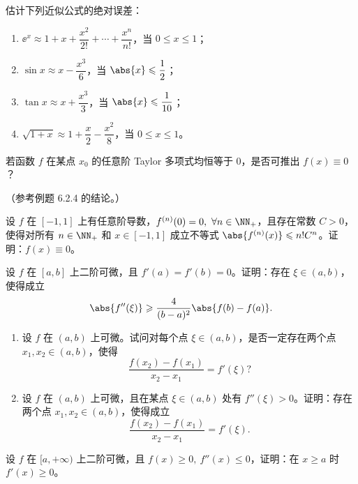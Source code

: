 \begin{xexercise}[8]
估计下列近似公式的绝对误差：
\begin{enumerate}[label=(\arabic*)]
  \item $\ee^x\approx1+x+\dfrac{x^2}{2!}+\cdots+\dfrac{x^n}{n!}$，当 $0\leqslant x\leqslant1$；
  \item $\sin x\approx x-\dfrac{x^3}{6}$，当 $\abs{x}\leqslant\dfrac12$；
  \item $\tan x\approx x+\dfrac{x^3}{3}$，当 $\abs{x}\leqslant\dfrac{1}{10}$；
  \item $\sqrt{1+x}\approx1+\dfrac{x}{2}-\dfrac{x^2}{8}$，当 $0\leqslant x\leqslant1$。
\end{enumerate}
\end{xexercise}

\begin{xexercise}[9]
若函数 $f$ 在某点 $x_0$ 的任意阶 Taylor 多项式均恒等于 0，是否可推出 $f(x)\equiv0$？

（参考例题 6.2.4 的结论。）
\end{xexercise}

\begin{xexercise}[10]
设 $f$ 在 $[-1,1]$ 上有任意阶导数，$f^{(n)}(0)=0,\ \forall n\in\NN_+$，且存在常数 $C>0$，使得对所有 $n\in\NN_+$ 和 $x\in[-1,1]$ 成立不等式 $\abs{f^{(n)}(x)}\leqslant n!C^n$。证明：$f(x)\equiv0$。
\end{xexercise}

\begin{xexercise}[11]
设 $f$ 在 $[a,b]$ 上二阶可微，且 $f'(a)=f'(b)=0$。证明：存在 $\xi\in(a,b)$，使得成立
\[
  \abs{f''(\xi)}\geqslant\frac{4}{(b-a)^2}\abs{f(b)-f(a)}.
\]
\end{xexercise}

\begin{xexercise}[12]
\begin{enumerate}[label=(\arabic*)]
  \item 设 $f$ 在 $(a,b)$ 上可微。试问对每个点 $\xi\in(a,b)$，是否一定存在两个点 $x_1,x_2\in(a,b)$，使得
  \[
    \frac{f(x_2)-f(x_1)}{x_2-x_1}=f'(\xi)?
  \]
  \item 设 $f$ 在 $(a,b)$ 上可微，且在某点 $\xi\in(a,b)$ 处有 $f''(\xi)>0$。证明：存在两个点 $x_1,x_2\in(a,b)$，使得成立
  \[
    \frac{f(x_2)-f(x_1)}{x_2-x_1}=f'(\xi).
  \]
\end{enumerate}
\end{xexercise}

\begin{xexercise}[13]
设 $f$ 在 $[a,+\infty)$ 上二阶可微，且 $f(x)\geqslant0,\ f''(x)\leqslant0$，证明：在 $x\geqslant a$ 时 $f'(x)\geqslant0$。
\end{xexercise}

